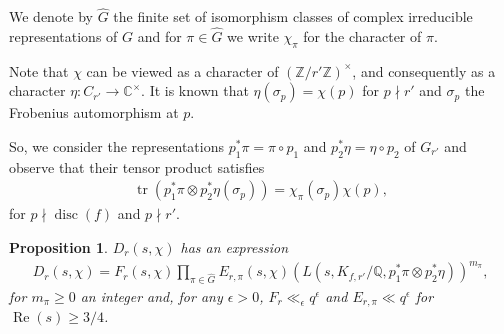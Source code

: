 \documentclass[12pt]{amsart}
\newtheorem{prop}{Proposition}
\def\C{{\mathbb C}}
\def\Q{{\mathbb Q}}
\def\Z{{\mathbb Z}}
\def\ge{\geqslant}
\begin{document}
We denote by $\hat{G}$ the finite set of isomorphism classes of complex irreducible representations of $G$ and for $\pi \in \hat{G}$ we write $\chi_{\pi}$ for the character of $\pi$.

Note that $\chi$ can be viewed as a character of $(\Z/r'\Z)^\times$,  and consequently as a character $\eta: C_{r'} \rightarrow \C^\times$.  It is known that $\eta(\sigma_p) = \chi(p)$ for $p\nmid r'$ and $\sigma_p$ the Frobenius automorphism at $p$.

So, we consider the representations $p_1^\ast\pi = \pi \circ p_1$ and $p^\ast_2\eta = \eta \circ p_2$ of $G_{r'}$ and observe that their tensor product satisfies
\begin{align}
\label{eq:tensor}
\operatorname{tr}(p_1^\ast \pi \otimes p_2^\ast \eta(\sigma_p)) = \chi_\pi(\sigma_p)\chi(p),
\end{align}
for $p\nmid \operatorname{disc}(f)$ and $p\nmid r'$. 

\begin{prop}
\label{prop:rep}
$D_r(s,\chi)$ has an expression
\begin{align*}
D_r(s,\chi) = F_r(s,\chi) \prod_{\pi \in \hat{G}} E_{r,\pi}(s,\chi) ( L(s, K_{f,r'}/\Q, p_1^\ast \pi \otimes p_2^\ast \eta))^{m_\pi},
\end{align*}
for $m_\pi \ge 0$ an integer and, for any $\epsilon>0$, $F_r\ll_{\epsilon} q^{\epsilon}$
 and $E_{r, \pi}\ll q^{\epsilon}$ for $\operatorname{Re}(s) \ge 3/4$.
\end{prop}
\end{document}
